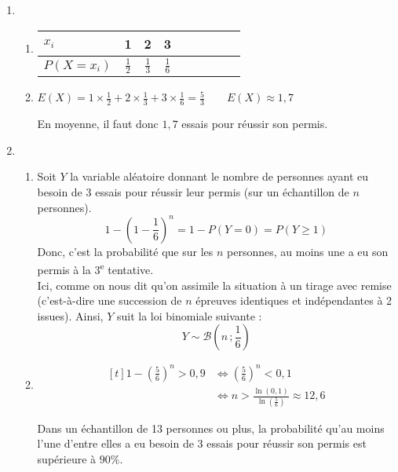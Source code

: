 \documentclass{scrartcl}
\begin{document}
\begin{adjustwidth}{2em}{0pt}
\begin{enumerate}
            \item   \begin{enumerate}[label=\alph*)]
                        \item  \hfill\begin{tabular}[t]{ | l || *{8}{c| } } \firsthline
                                    $x_i$                     & 1             & 2             & 3               \\ \hline
                                    $P(X=x_i)$ \hspace{0.5cm} & $\frac{1}{2}$ & $\frac{1}{3}$ & $\frac{1}{6}$   \\ \hline
                                \end{tabular}\hfill\mbox{}
                                \parbox{\linewidth}{}  
                        \item   $E(X)=1\times\frac{1}{2}+2\times\frac{1}{3}+3\times\frac{1}{6}=\frac{5}{3}\qquad\boxed{E(X)\approx 1{,}7}$ \par
                                En moyenne, il faut donc $1{,}7$ essais pour réussir son permis.
                    \end{enumerate}
            \item   \begin{enumerate}[label=\alph*)]
                        \item   Soit $Y$ la variable aléatoire donnant le nombre de personnes ayant eu besoin de 3 essais pour réussir leur permis (sur un échantillon de $n$ personnes).
                        \[1-\left(1-\frac{1}{6}\right)^n=1-P(Y=0)=\boxed{P(Y\geq 1)}\] 
                        Donc, c'est la probabilité que sur les $n$ personnes, au moins une a eu son permis à la 3\textsuperscript{e} tentative. \\ Ici, comme on nous dit qu'on assimile la situation à un tirage avec remise (c'est-à-dire une succession de $n$ épreuves identiques et indépendantes à 2 issues). Ainsi, $Y$ suit la loi binomiale suivante :
                        \[Y\sim\mathcal{B}\left(n\,;\frac{1}{6}\right)\]

                        \item   \[\begin{aligned}[t]
                                    1-\left(\frac{5}{6}\right)^n>0{,}9&\iff\left(\frac{5}{6}\right)^n<0{,}1 \\
                                    &\iff n>\frac{\ln\left(0{,}1\right)}{\ln\left(\tfrac{5}{6}\right)}\approx 12{,}6
                                \end{aligned}\]
                                 \par
                                Dans un échantillon de 13 personnes ou plus, la probabilité qu'au moins l'une d'entre elles  a eu besoin de 3 essais pour réussir son permis est supérieure à $90\%$.
                    \end{enumerate}
        \end{enumerate}
    \end{adjustwidth}
\end{document}
